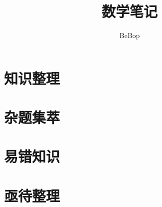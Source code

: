 \documentclass{book}
\begin{document}
    \title{数学笔记}
    \author{BeBop}
    \maketitle
    \newpage

    \tableofcontents
    \newpage
    
    \part{知识整理}


    \part{杂题集萃}

    \part{易错知识} %

    \part{亟待整理} %
    
\end{document}
